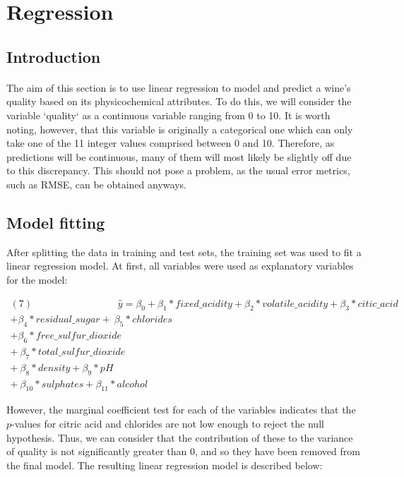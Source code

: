 \documentclass[10pt]{article}
\begin{document}
\section{Regression}

\subsection{Introduction}
\paragraph*{}
The aim of this section is to use linear regression to model and predict a wine's quality based on its physicochemical attributes. To do this, we will consider the variable `quality` as a continuous variable ranging from 0 to 10. It is worth noting, however, that this variable is originally a categorical one which can only take one of the 11 integer values comprised between 0 and 10. Therefore, as predictions will be continuous, many of them will most likely be slightly off due to this discrepancy. This should not pose a problem,  as the usual error metrics, such as RMSE, can be obtained anyways.


\subsection{Model fitting}
After splitting the data in training and test sets, the training set was used to fit a linear regression model. At first, all variables were used as explanatory variables for the model:

\begin{equation*}
\begin{aligned}	
(7) \ \ \ \ \ \ \  \ \ \ \ \ \  \ \ \ \ \ \ \ \ \ \ \ \ \ \ \ \ \ \ \ \ \ \ \ \ \ \ \hat{y} = \beta_0 + \beta_1*fixed\_acidity + \beta_2*volatile\_acidity 
+ \beta_3*citic\_acid  \\ +\beta_4*residual\_sugar 
+ \ \beta_5*chlorides\\ + \beta_6*free\_sulfur\_dioxide  \\+ \ \beta_7*total\_sulfur\_dioxide   
\\ + \ \beta_8*density + \beta_9*pH  \\+ \ \beta_{10}*sulphates + \beta_{11}*alcohol 	
\end{aligned}
\end{equation*}

However, the marginal coefficient test for each of the variables indicates that the $p$-values for citric acid and chlorides are not low enough to reject the null hypothesis. Thus, we can consider that the contribution of these to the variance of quality is not significantly greater than 0, and so they have been removed from the final model. The resulting linear regression model is described below:
\end{document}
